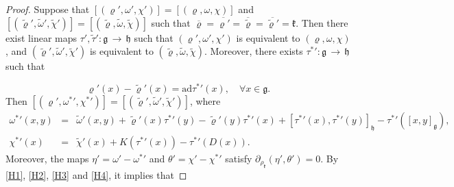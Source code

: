 \documentclass[10pt,a4paper]{amsart}
\newcommand {\emptycomment}[1]{}
\newcommand{\ad}{\mathrm{ad}}
\newcommand{\frkk}{\mathfrak k}
\newcommand{\g}{\mathfrak g}
\newcommand{\h}{\mathfrak h}
\newcommand{\lon }{\,\rightarrow\,}
\begin{document}
\begin{proof}
Suppose that $[(\varrho', \omega', \chi')]=[(\varrho, \omega, \chi)]$ and $
[(\tilde{\varrho}', \tilde{\omega}', \tilde{\chi}')]=[(\tilde{\varrho}, \tilde{\omega}, \tilde{\chi})]$ such that $\overline{\varrho}=\overline{\varrho'}=\overline{\tilde{\varrho}}=\overline{\tilde{\varrho}'}=\frkk$. Then there exist linear maps $\tau', \tilde{\tau}':\g\lon\h$ such that $(\varrho', \omega', \chi')$ is equivalent to $(\varrho, \omega, \chi)$, and $(\tilde{\varrho}', \tilde{\omega}', \tilde{\chi}')$ is equivalent to $(\tilde{\varrho}, \tilde{\omega}, \tilde{\chi})$.
Moreover, there exists $\tau^{*}{'}:\g\lon\h$ such that
\emptycomment{
\begin{eqnarray*}
\left\{\begin{array}{rcl}
\varrho(x)u-\varrho'(x)u&=&[\tau'(x), u]_\h,\\
\omega(x, y)-\omega'(x, y)&=&\varrho'(x)\tau'(y)-\varrho'(y)\tau'(x)+[\tau'(x), \tau'(y)]_\h-\tau'([x, y]_\g),\\
\chi(x)-\chi'(x)&=&K(\tau'(x))-\tau'(D(x)),
\end{array}\right.
\end{eqnarray*}
\begin{eqnarray*}
\left\{\begin{array}{rcl}
\tilde{\varrho}(x)u-\tilde{\varrho}'(x)u&=&[\tilde{\tau}'(x), u]_\h,\\
\tilde{\omega}(x, y)-\tilde{\omega}'(x, y)&=&\tilde{\varrho}'(x)\tilde{\tau}'(y)-\tilde{\varrho}'(y)\tilde{\tau}'(x)+[\tilde{\tau}'(x), \tilde{\tau}'(y)]_\h-\tilde{\tau}'([x, y]_\g),\\
\tilde{\chi}(x)-\tilde{\chi}'(x)&=&K(\tilde{\tau}'(x))-\tilde{\tau}'(D(x)),
\end{array}\right.
\end{eqnarray*}
for all $x, y\in\g, u\in\h$, and}
$$\varrho'(x)-\tilde{\varrho}'(x)=\ad\tau^{*}{'}(x), \quad\forall x\in\g.$$ Then $[(\varrho', \omega^{*}{'}, \chi^{*}{'})]=[(\tilde{\varrho}', \tilde{\omega}', \tilde{\chi}')]$, where
\begin{eqnarray}
\label{H3}\omega^{*}{'}(x, y)&=&\tilde{\omega}'(x, y)+\tilde{\varrho}'(x)\tau^{*}{'}(y)-\tilde{\varrho}'(y)\tau^{*}{'}(x)+[\tau^{*}{'}(x), \tau^{*}{'}(y)]_\h-\tau^{*}{'}([x, y]_\g),\\
\label{H4}\chi^{*}{'}(x)&=&\tilde{\chi}'(x)+K(\tau^{*}{'}(x))-\tau^{*}{'}(D(x)).
\end{eqnarray}
Moreover, the maps $\eta'=\omega'-\omega^{*}{'}$ and $\theta'=\chi'-\chi^{*}{'}$ satisfy $\partial_{\rho_\frkk}(\eta', \theta')=0$. By \eqref{H1}, \eqref{H2}, \eqref{H3} and \eqref{H4}, it implies that

\end{proof}
\end{document}
